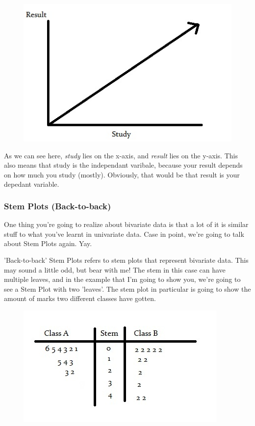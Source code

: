 \documentclass[11pt]{article}
\begin{document}
\clearpage{}
\begin{figure}[htp]
\centering
\includegraphics[scale=0.80]{BiVariableImage11.jpg}
\end{figure}

As we can see here, \emph{study} lies on the x-axis, and \emph{result} lies on the y-axis. This also means that study is the independant varibale, because your result depends on how much you study (mostly). Obviously, that would be that result is your depedant variable. 

\subsubsection*{Stem Plots (Back-to-back)}

One thing you're going to realize about bivariate data is that a lot of it is similar stuff to what you've learnt in univariate data. Case in point, we're going to talk about Stem Plots again. Yay.

'Back-to-back' Stem Plots refers to stem plots that represent bivariate data. This may sound a little odd, but bear with me! The stem in this case can have multiple leaves, and in the example that I'm going to show you, we're going to see a Stem Plot with two 'leaves'. The stem plot in particular is going to show the amount of marks two different classes have gotten.

\clearpage{}
\begin{figure}[htp]
\centering
\includegraphics[scale=1.00]{StemDoubleLeafImage11.jpg}
\end{figure}
\end{document}
